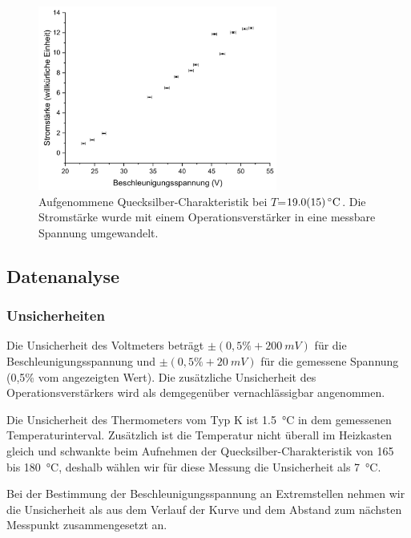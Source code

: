 \documentclass[
	a4paper,
	12pt,
	pagesize,
	ngerman
]{scrartcl}
\begin{document}
	\begin{figure}[H]
		\includegraphics[width=0.7\textwidth]{Hg19}
		\centering
		\caption{Aufgenommene Quecksilber-Charakteristik bei $T$=$\SI{19,0 +- 1,5}{\degreeCelsius}$. Die Stromstärke wurde mit einem Operationsverstärker in eine messbare Spannung umgewandelt.}
		\label{Hg19}
		\centering
	\end{figure}
	
	\subsection{Datenanalyse}
	\subsubsection{Unsicherheiten}
	Die Unsicherheit des  Voltmeters beträgt $\pm (0,5\% + \SI{200}{mV})$ für die Beschleunigungsspannung und $\pm (0,5\% + \SI{20}{mV})$ für die gemessene Spannung (0,5\% vom angezeigten Wert).\cite{FH-Pforzheim} Die zusätzliche Unsicherheit des Operationsverstärkers wird als demgegenüber vernachlässigbar angenommen. 
	
	Die Unsicherheit des Thermometers vom Typ K ist \SI{1,5}{\degreeCelsius} in dem gemessenen Temperaturinterval.\cite{DIN} 
	Zusätzlich ist die Temperatur nicht überall im Heizkasten gleich und schwankte beim Aufnehmen der Quecksilber-Charakteristik von 165 bis \SI{180}{\degreeCelsius}, deshalb wählen wir für diese Messung die Unsicherheit als \SI{7}{\degreeCelsius}.
	
	Bei der Bestimmung der Beschleunigungsspannung an Extremstellen nehmen wir die Unsicherheit als aus dem Verlauf der Kurve und dem Abstand zum nächsten Messpunkt zusammengesetzt an.
	
\end{document}

